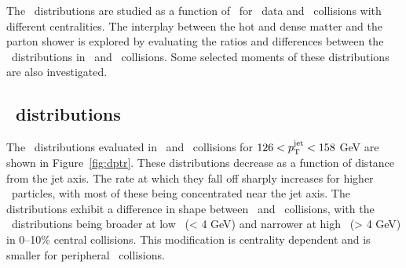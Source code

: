 
The \Dptr\ distributions are studied as a function of \ptjet\ for \pp\ data and \PbPb\ collisions with different centralities.
The interplay between the hot and dense matter and the parton shower is explored by evaluating the ratios and differences between the \Dptr\ distributions in \pbpb\ and \pp\ collisions.
Some selected moments of these distributions are also investigated.



\subsection{\Dptr\ distributions}
\label{sec:dptr}
The \Dptr\ distributions evaluated in \pp\ and \pbpb\ collisions for $126 < \mbox{$p_{\mathrm{T}}^{\mathrm{jet}}$} < 158$ GeV are shown in Figure~\ref{fig:dptr}.
These distributions decrease as a function of distance from the jet axis.
The rate at which they fall off sharply increases for higher \pt\ particles, with most of these being concentrated near the jet axis.
The distributions exhibit a difference in shape between \PbPb\ and \pp\ collisions, with the \pbpb\ distributions being broader at low \pt\ (\pt < 4 GeV) and narrower at high \pt\ (\pt > 4 GeV) in \mbox{0--10\%} central collisions.
This modification is centrality dependent and is smaller for peripheral \pbpb\ collisions.

